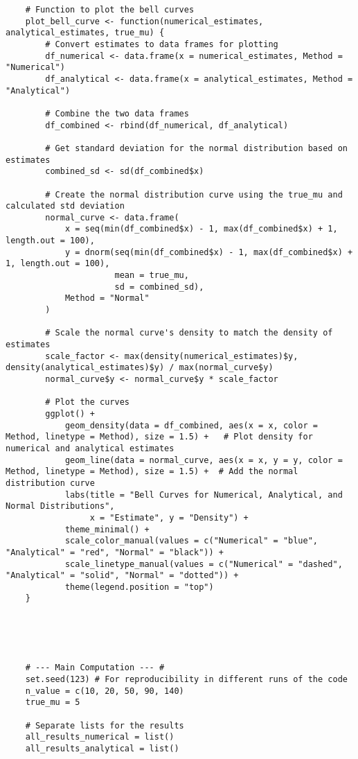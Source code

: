 \begin{verbatim}
    # Function to plot the bell curves
    plot_bell_curve <- function(numerical_estimates, analytical_estimates, true_mu) {
        # Convert estimates to data frames for plotting
        df_numerical <- data.frame(x = numerical_estimates, Method = "Numerical")
        df_analytical <- data.frame(x = analytical_estimates, Method = "Analytical")

        # Combine the two data frames
        df_combined <- rbind(df_numerical, df_analytical)

        # Get standard deviation for the normal distribution based on estimates
        combined_sd <- sd(df_combined$x)

        # Create the normal distribution curve using the true_mu and calculated std deviation
        normal_curve <- data.frame(
            x = seq(min(df_combined$x) - 1, max(df_combined$x) + 1, length.out = 100),
            y = dnorm(seq(min(df_combined$x) - 1, max(df_combined$x) + 1, length.out = 100),
                      mean = true_mu,
                      sd = combined_sd),
            Method = "Normal"
        )

        # Scale the normal curve's density to match the density of estimates
        scale_factor <- max(density(numerical_estimates)$y, density(analytical_estimates)$y) / max(normal_curve$y)
        normal_curve$y <- normal_curve$y * scale_factor

        # Plot the curves
        ggplot() +
            geom_density(data = df_combined, aes(x = x, color = Method, linetype = Method), size = 1.5) +   # Plot density for numerical and analytical estimates
            geom_line(data = normal_curve, aes(x = x, y = y, color = Method, linetype = Method), size = 1.5) +  # Add the normal distribution curve
            labs(title = "Bell Curves for Numerical, Analytical, and Normal Distributions",
                 x = "Estimate", y = "Density") +
            theme_minimal() +
            scale_color_manual(values = c("Numerical" = "blue", "Analytical" = "red", "Normal" = "black")) +
            scale_linetype_manual(values = c("Numerical" = "dashed", "Analytical" = "solid", "Normal" = "dotted")) +
            theme(legend.position = "top")
    }





    # --- Main Computation --- #
    set.seed(123) # For reproducibility in different runs of the code
    n_value = c(10, 20, 50, 90, 140)
    true_mu = 5

    # Separate lists for the results
    all_results_numerical = list() 
    all_results_analytical = list()


\end{verbatim}
